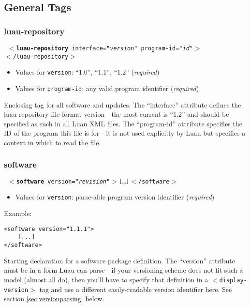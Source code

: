 \documentclass{report}
\begin{document}
\subsection{General Tags}

\subsubsection{luau-repository}

\texttt{
$<$\textbf{luau-repository} interface="\emph{version}" program-id="\emph{id}"$>$ \newline
\qquad [\ldots]\\
$<$/luau-repository$>$
}
\begin{itemize}
\item Values for \texttt{version}: ``1.0'', ``1.1'', ``1.2'' (\emph{required})
\item Values for \texttt{program-id}: any valid program identifier (\emph{required})
\end{itemize}

Enclosing tag for all software and updates.  The ``interface'' attribute defines the luau-repository file format version---the most current is ``1.2'' and should be specified as such in all Luau XML files.  The ``program-id'' attribute specifies the ID of the program this file is for---it is not used explicitly by Luau but specifies a context in which to read the file.

\subsubsection{software}
\texttt{
$<$\textbf{software} version="\emph{revision}"$>$[\ldots]$<$/software$>$
}
\begin{itemize}
\item Values for \texttt{version}: parse-able program version identifier (\emph{required})
\end{itemize}

Example: 

\begin{verbatim}
<software version="1.1.1">
    [...]
</software>
\end{verbatim}

Starting declaration for a software package definition.  The ``version'' attribute must be in a form Luau can parse---if your versioning scheme does not fit such a model (almost all do), then you'll have to specify that definition in a \texttt{$<$display-version$>$} tag and use a different easily-readable version identifier here.  See section \ref{sec:versionparsing} below.
\end{document}
